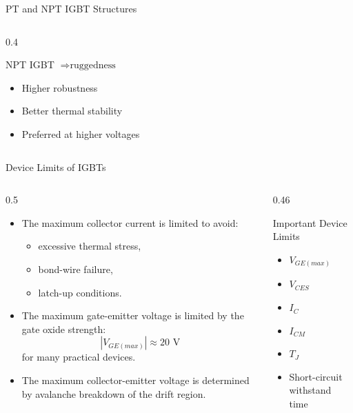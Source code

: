 \begin{frame}{PT and NPT IGBT Structures}
\begin{columns}
\begin{column}{0.4\textwidth}
\vspace{0.15cm}

\begin{block}{NPT IGBT $\Rightarrow \text{ruggedness}$}
\begin{itemize}
    \item Higher robustness
    \item Better thermal stability
    \item Preferred at higher voltages
\end{itemize}
\end{block}
\end{column}
\end{columns}
\end{frame}


\begin{frame}{Device Limits of IGBTs}
\begin{columns}
\begin{column}{0.5\textwidth}
\begin{itemize}
    \item The maximum collector current is limited to avoid:
    \begin{itemize}
        \item excessive thermal stress,
        \item bond-wire failure,
        \item latch-up conditions.
    \end{itemize}
    
    \item The maximum gate-emitter voltage is limited by the gate oxide strength:
    \[
        |V_{GE(max)}| \approx 20\text{ V}
    \]
    for many practical devices.
    
    \item The maximum collector-emitter voltage is determined by avalanche breakdown of the drift region.
    
\end{itemize}
\end{column}

\begin{column}{0.46\textwidth}
\begin{block}{Important Device Limits}
\begin{itemize}
    \item $V_{GE(max)}$
    \item $V_{CES}$
    \item $I_C$
    \item $I_{CM}$
    \item $T_J$
    \item Short-circuit withstand time
\end{itemize}
\end{block}

\end{column}
\end{columns}
\end{frame}



